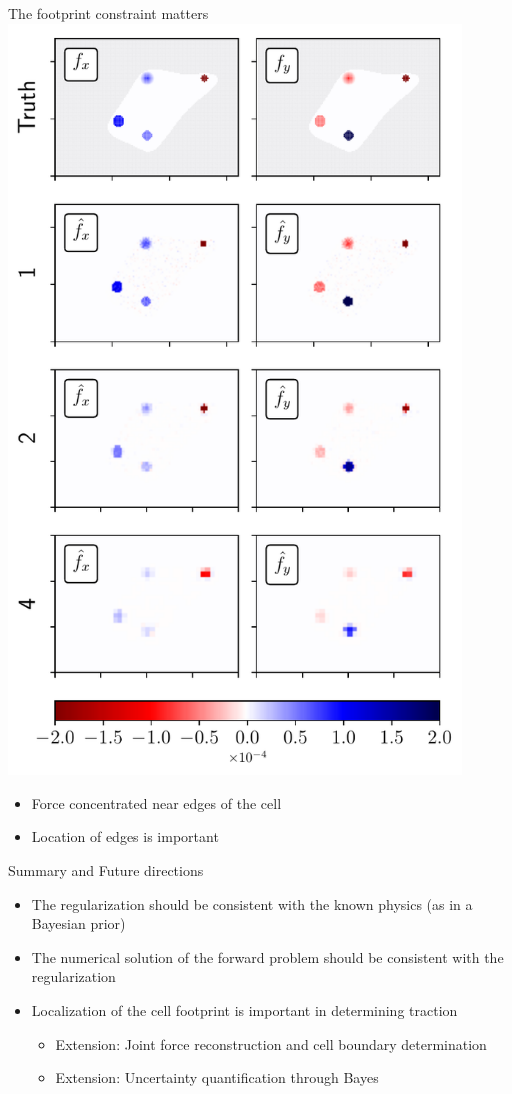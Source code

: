 \documentclass[presentation,aspectratio=169]{beamer}
\begin{document}
\begin{frame}{The footprint constraint matters}
\centering
\includegraphics[width=0.9\textwidth]{figures/fig4}
\begin{itemize}
\item Force concentrated near edges of the cell
\item Location of edges is important
\end{itemize}
\end{frame}

\begin{frame}{Summary and Future directions}
\begin{itemize}
\item The regularization should be consistent with the known physics (as in a Bayesian prior)
\item The numerical solution of the forward problem should be consistent with the regularization
\item Localization of the cell footprint is important in determining traction
\begin{itemize}
\item Extension: Joint force reconstruction and cell boundary determination
\item Extension: Uncertainty quantification through Bayes
\end{itemize}
\end{itemize}
\end{frame}
\end{document}
